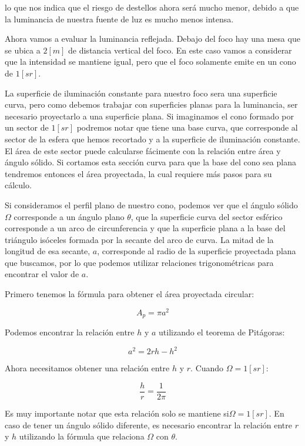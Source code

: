 \documentclass[11pt]{article}
\begin{document}
lo que nos indica que el riesgo de destellos ahora será mucho menor, debido a que la luminancia de nuestra fuente de luz es mucho menos intensa.

Ahora vamos a evaluar la luminancia reflejada. Debajo del foco hay una mesa que se ubica a $ 2 \left[ m \right] $ de distancia vertical del foco. En este caso vamos a considerar que la intensidad se mantiene igual, pero que el foco solamente emite en un cono de $ 1 \left[ sr \right] $.

La superficie de iluminación constante para nuestro foco sera una superficie curva, pero como debemos trabajar con superficies planas para la luminancia, ser necesario proyectarlo a una superficie plana. Si imaginamos el cono formado por un sector de $ 1 \left[ sr \right] $ podremos notar que tiene una base curva, que corresponde al sector de la esfera que hemos recortado y a la superficie de iluminación constante. El área de este sector puede calcularse fácimente con la relación entre área y ángulo sólido. Si cortamos esta sección curva para que la base del cono sea plana tendremos entonces el área proyectada, la cual requiere más pasos para su cálculo.

Si consideramos el perfil plano de nuestro cono, podemos ver que el ángulo sólido $ \Omega $ corresponde a un ángulo plano $ \theta $, que la superficie curva del sector esférico corresponde a un arco de circunferencia y que la superficie plana a la base del triángulo isóceles formada por la secante del arco de curva. La mitad de la longitud de esa secante, $ a $, corresponde al radio de la superficie proyectada plana que buscamos, por lo que podemos utilizar relaciones trigonométricas para encontrar el valor de $ a $.

Primero tenemos la fórmula para obtener el área proyectada circular:

\[ A_p = \pi a^2 \]

Podemos encontrar la relación entre $ h $ y $ a $ utilizando el teorema de Pitágoras:


\begin{equation} \label{eq:1}
    a^2 = 2 r h - h^2 
\end{equation}

Ahora necesitamos obtener una relación entre $ h $ y $ r $. Cuando $ \Omega = 1 \left[ sr \right] $:

\[ \frac{ h }{ r } = \frac{ 1 }{ 2 \pi } \]

Es muy importante notar que esta relación solo se mantiene si$ \Omega = 1 \left[ sr \right] $. En caso de tener un ángulo sólido diferente, es necesario encontrar la relación entre $ r $ y $ h $ utilizando la fórmula que relaciona $ \Omega $ con $ \theta $.
\end{document}
